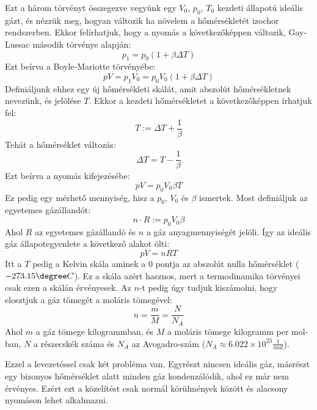 \documentclass[a4paper,12pt]{article}
\begin{document}
Ezt a három törvényt összegezve vegyünk egy $V_0$, $p_0$, $T_0$ kezdeti állapotú ideális gázt, és nézzük meg, hogyan változik ha növelem a hőmérsékletét izochor rendszerben. 
Ekkor felírhatjuk, hogy a nyomás a következőképpen változik, Gay-Lussac második törvénye alapján:
\begin{equation}
    p_1 = p_0 (1 + \beta \Delta T)
\end{equation}
Ezt beírva a Boyle-Mariotte törvényébe:
\begin{equation}
    pV = p_1 V_0 = p_0 V_0(1 + \beta \Delta T)
\end{equation}
Definiáljunk ehhez egy új hőmérsékleti skálát, amit abszolút hőmérsékletnek nevezünk, és jelölése $T$. Ekkor a kezdeti hőmérsékletet a következőképpen írhatjuk fel:
\begin{equation}
    T := \Delta T + \frac{1}{\beta}
\end{equation}
Tehát a hőmérséklet változás:
\begin{equation}
    \Delta T = T - \frac{1}{\beta}
\end{equation}
Ezt beírva a nyomás kifejezésébe:
\begin{equation}
    pV = p_0 V_0 \beta T
\end{equation}
Ez pedig egy mérhető mennyiség, hisz a $p_0$, $V_0$ és $\beta$ ismertek. Most definiáljuk az egyetemes gázállandót:
\begin{equation}
    n \cdot R := p_0 V_0 \beta
\end{equation}
Ahol $R$ az egyetemes gázállandó és $n$ a gáz anyagmennyiségét jelöli. Így az ideális gáz állapotegyenlete a következő alakot ölti:
\begin{equation}
    pV = nRT
\end{equation}
Itt a $T$ pedig a Kelvin skála aminek a 0 pontja az abszolút nulla hőmérséklet ($-273.15\degree C$). Ez a skála azért hasznos, mert a termodinamika törvényei csak ezen a skálán érvényesek.
Az $n$-t pedig úgy tudjuk kiszámolni, hogy elosztjuk a gáz tömegét a moláris tömegével:
\begin{equation}
    n = \frac{m}{M} = \frac{N}{N_A}
\end{equation}
Ahol $m$ a gáz tömege kilogrammban, és $M$ a moláris tömege kilogramm per mol-ban, $N$ a részecskék száma és $N_A$ az Avogadro-szám ($N_A \approx 6.022 \times 10^{23} \frac{1}{mol}$).

Ezzel a levezetéssel csak két probléma van. Egyrészt nincsen ideális gáz, másrészt egy bizonyos hőmérséklet alatt minden gáz kondenzálódik, ahol ez már nem érvényes.
Ezért ezt a közelítést csak normál körülmények között és alacsony nyomáson lehet alkalmazni.
\end{document}
